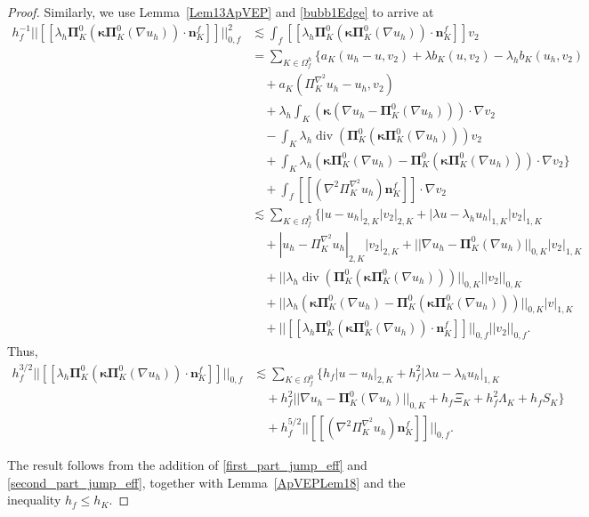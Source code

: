 \documentclass[final,reqno]{elsarticle}
\newcommand\vdiv{\mathop{\mathrm{div}}\nolimits}
\newcommand{\jump}[1]{[\![#1]\!]}
\def\bn{\boldsymbol{n}}
\def\bkappa{\boldsymbol{\kappa}}
\def\bPi{\mathbf{\Pi}}
\begin{document}
\begin{proof}
Similarly, we use Lemma~\ref{Lem13ApVEP} and \eqref{bubb1Edge} to arrive at
\begin{align*}
h^{-1}_f|| \jump{\lambda_h\bPi_K^0(\bkappa \bPi_K^0(\nabla u_h ))\cdot \bn_K^f}||_{0,f}^2 &\lesssim 
\int_f \jump{\lambda_h\bPi_K^0(\bkappa \bPi_K^0(\nabla u_h ))\cdot \bn_K^f} v_2\nonumber\\
&= \sum_{K\in \Omega^h_f} \bigg\{ a_K(u_h-u,v_2) + \lambda b_K(u,v_2)-\lambda_h b_K(u_h,v_2) \nonumber\\
&\quad + a_K(\Pi_K^{\nabla^2} u_h-u_h,v_2) \\
&\quad + \lambda_h \int_K (\bkappa(\nabla u_h - \bPi_K^0 (\nabla u_h)))\cdot \nabla v_2 \nonumber\\
&\quad - \int_{K}\lambda_h \vdiv\left( \bPi_K^0 (\bkappa \bPi_K^0(\nabla u_h))\right) v_2 \\
&\quad + \int_K \lambda_h \left(\bkappa \bPi_K^0(\nabla u_h)-\bPi_K^0(\bkappa \bPi_K^0(\nabla u_h))\right) \cdot \nabla v_2\bigg\} \nonumber \\
&\quad + \int_f \jump{(\nabla^2\Pi_K^{\nabla^2} u_h )\boldsymbol{n}_K^{f}}\cdot \nabla v_2 \\
&\lesssim  \sum\limits_{K\in \Omega^h_f}\Bigg\{ |u-u_h|_{2,K}|v_2|_{2,K}+ |\lambda u -\lambda_h u_h |_{1,K}|v_2|_{1,K} \\
&\quad + |u_h-\Pi_K^{\nabla^2} u_h|_{2,K}|v_2|_{2,K} + ||\nabla u_h - \bPi_K^0 (\nabla u_h)||_{0,K}|v_2|_{1,K}\nonumber \\
&\quad +|| \lambda_h \vdiv\left( \bPi_K^0 (\bkappa \bPi_K^0(\nabla u_h))\right) ||_{0,K}|| v_2||_{0,K} \nonumber\\
&\quad + ||\lambda_h \left(\bkappa \bPi_K^0(\nabla u_h)-\bPi_K^0(\bkappa \bPi_K^0(\nabla u_h))\right) ||_{0,K}|v|_{1,K} \nonumber\\
&\quad + ||\jump{\lambda_h\bPi_K^0(\bkappa \bPi_K^0(\nabla u_h ))\cdot \bn_K^{f}}||_{0,f} ||v_2||_{0,f}.
\end{align*}
Thus,
\begin{align}
    h^{3/2}_f||\jump{\lambda_h\bPi_K^0(\bkappa \bPi_K^0(\nabla u_h ))\cdot \bn_K^f}||_{0,f} &\lesssim \sum\limits_{K\in \Omega^h_f}\Bigg\{ h_f |u-u_h|_{2,K} + h_f^2|\lambda u -\lambda_h u_h |_{1,K} \nonumber\\
    &\quad + h_f^2||\nabla u_h - \bPi_K^0 (\nabla u_h)||_{0,K} + h_f\Xi_K + h_f^2\Lambda_K + h_f S_K \bigg\} \nonumber\\
    &\quad + h_f^{5/2}||[\![(\nabla^2\Pi_K^{\nabla^2} u_h )\boldsymbol{n}_K^{f}]\!]||_{0,f}. \label{second_part_jump_eff}
\end{align}

The result follows from the addition of \eqref{first_part_jump_eff} and \eqref{second_part_jump_eff}, together with Lemma~\ref{ApVEPLem18} and the inequality $h_f\leq h_K$.
\end{proof}
\end{document}

